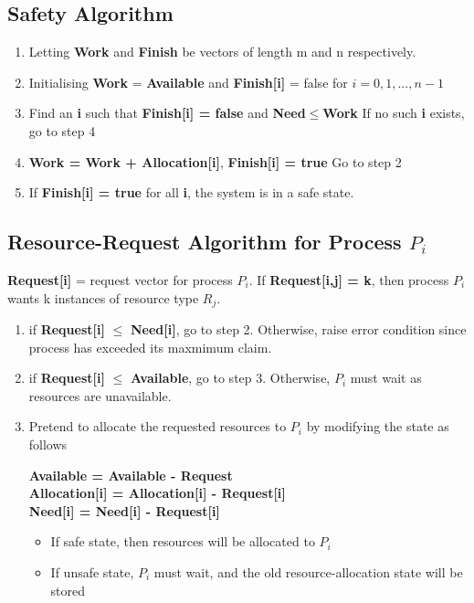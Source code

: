 \documentclass[oneside]{book}
\begin{document}
            \subsection{Safety Algorithm}
                \begin{enumerate}
                    \item Letting \textbf{Work} and \textbf{Finish} be vectors of length m and n respectively.
                    \item Initialising \textbf{Work} = \textbf{Available} and \textbf{Finish[i]} = false for $i = 0,1,...,n-1$
                    \item Find an \textbf{i} such that \textbf{Finish[i] = false} and \textbf{Need$\leq$Work}
                        \subitem If no such \textbf{i} exists, go to step 4
                    \item \textbf{Work = Work + Allocation[i]}, \textbf{Finish[i] = true}
                        \subitem Go to step 2
                    \item If \textbf{Finish[i] = true} for all \textbf{i}, the system is in a safe state.
                \end{enumerate}
            \subsection{Resource-Request Algorithm for Process $P_i$}
                \textbf{Request[i]} = request vector for process $P_i$. If \textbf{Request[i,j] = k}, then process
                $P_i$ wants k instances of resource type $R_j$.\\
                \begin{enumerate}
                    \item if \textbf{Request[i]} $\leq$ \textbf{Need[i]}, go to step 2. Otherwise, raise error condition
                    since process has exceeded its maxmimum claim.
                    \item if \textbf{Request[i]} $\leq$ \textbf{Available}, go to step 3. Otherwise, $P_i$ must wait as
                    resources are unavailable.
                    \item Pretend to allocate the requested resources to $P_i$ by modifying the state as follows
                        \begin{center}
                            \textbf{Available = Available - Request}\\
                            \textbf{Allocation[i] = Allocation[i] - Request[i]}\\
                            \textbf{Need[i] = Need[i] - Request[i]}\\
                        \end{center}
                        \begin{itemize}
                            \item If safe state, then resources will be allocated to $P_i$
                            \item If unsafe state, $P_i$ must wait, and the old resource-allocation state will be stored
                        \end{itemize}
                \end{enumerate}
\end{document}
